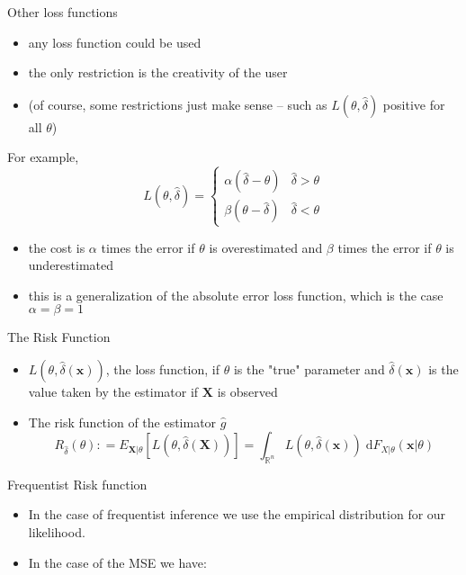 \documentclass[11pt]{beamer}
\begin{document}
\begin{frame}{Other loss functions}
\begin{itemize}
\item any loss function could be used
\item the only restriction is the creativity of the user
\item (of course, some restrictions just make sense -- such as $L(\theta,\hat{\delta})$ positive for all $\theta$)
\end{itemize}
For example,
\begin{equation}
L(\theta,\hat{\delta})= \left\{
\begin{array}{cc}
\alpha (\hat{\delta}-\theta) & \hat{\delta} > \theta \\
\beta (\theta-\hat{\delta}) & \hat{\delta} < \theta
\end{array}
\right.
\end{equation}
\begin{itemize}
\item the cost is $\alpha$ times the error if $\theta$ is overestimated and $\beta$ times the error if $\theta$ is underestimated
\item this is a generalization of the absolute error loss function, which is the case $\alpha=\beta=1$
\end{itemize}
\end{frame}
\begin{frame}{The Risk Function}


\begin{itemize}
\item $L(\theta,\hat{\delta}(\mathbf{x}))$, the loss function, if $\theta$ is the "true" parameter and $\hat{\delta}(\mathbf{x})$ is the value taken by the estimator if $\mathbf{X}$ is observed

\vfill

\item The \alert{risk function} of the estimator $\hat{g}$
\begin{equation}\label{E_RF}
R_{\hat{\delta}}(\theta) \mathrel{\mathop:}=  E_{\mathbf{X}|\theta} [ L(\theta,\hat{\delta}(\mathbf{X}))]=\int_{\mathbb{R}^n} L(\theta,\hat{\delta}(\mathbf{x})) \;\text{d} F_{X|\theta}(\mathbf{x}|\theta)
\end{equation}

\end{itemize}
\end{frame}
\begin{frame}{Frequentist Risk function}


\vspace{-3 cm}
\begin{itemize}

\item In the case of frequentist inference we use the empirical distribution for our likelihood.

\item In the case of the MSE we have:

\end{itemize}



\end{frame}
\end{document}
